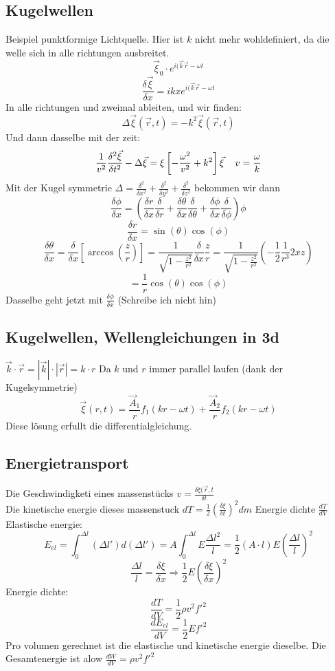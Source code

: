 \documentclass{article}
\newcommand{\mspc}{\hspace{0.4cm}}
\begin{document}
\subsection{Kugelwellen}
Beispiel punktformige Lichtquelle. Hier ist $k$ nicht mehr wohldefiniert, da die welle sich in alle richtungen ausbreitet.
\[\vec{\xi}_0\cdot e^{i(\vec{k}\vec{r}-\omega t}\]
\[\frac{\delta \vec{\xi}}{\delta x}=ikxe^{i(\vec{k}\vec{r}- \omega t}\]
In alle richtungen und zweimal ableiten, und wir finden:
\[\Delta\vec{\xi}(\vec{r},t)=-k^2\vec{\xi}(\vec{r},t)\]
Und dann dasselbe mit der zeit:
\[\frac{1}{v^2}\frac{\delta^2\vec{\xi}}{\delta t^2}-\Delta\vec{\xi}=\xi\left[-\frac{\omega^2}{v^2}+k^2\right]\vec{\xi}\mspc v=\frac{\omega}{k}\]
Mit der Kugel symmetrie $\Delta = \frac{\delta^2}{\delta x^2}+\frac{\delta^2}{\delta y^2}+\frac{\delta^2}{\delta z^2}$
bekommen wir dann 
\[\frac{\delta \phi}{\delta x}=\left(\frac{\delta r}{\delta x}\frac{\delta}{\delta r}+\frac{\delta \theta}{\delta x}\frac{\delta}{\delta \theta}+\frac{\delta \phi}{\delta x}\frac{\delta}{\delta \phi}\right)\phi\]
\[\frac{\delta r}{\delta x}=\sin(\theta)\cos(\phi)\]
\[\frac{\delta\theta}{\delta x}=\frac{\delta}{\delta x}\left[\arccos\left(\frac{z}{r}\right)\right]=\frac{1}{\sqrt{1-\frac{z^2}{r^2}}}\frac{\delta}{\delta x}\frac{z}{r}=\frac{1}{\sqrt{1-\frac{z^2}{r^2}}}\left(-\frac{1}{2}\frac{1}{r^3}2xz\right)\]
\[=\frac{1}{r}\cos(\theta)\cos(\phi)\]
Dasselbe geht jetzt mit $\frac{\delta \phi}{\delta x}$ (Schreibe ich nicht hin)
\subsection{Kugelwellen, Wellengleichungen in 3d}$\vec{k}\cdot\vec{r}= |\vec{k}|\cdot|\vec{r}|=k\cdot r$ Da $k$ und $r$ immer parallel laufen (dank der Kugelsymmetrie)
\[\vec{\xi}(r,t)=\frac{\vec{A}_1}{r}f_1(kr-\omega t)+\frac{\vec{A}_2}{r}f_2(kr-\omega t)\]
Diese lösung erfullt die differentialgleichung.
\subsection{Energietransport} Die Geschwindigketi eines massenstücks $v=\frac{\delta \xi(\vec{r},t}{\delta t}$\\
Die kinetische energie dieses massenstuck $dT=\frac{1}{2}\left(\frac{\delta \xi}{\delta t}\right)^2 dm$
Energie dichte $\frac{dT}{dV}$
\\
Elastische energie:
\[E_{el}=\int_0^{\Delta l}(\Delta l')d(\Delta l')=A\int_0^{\Delta l}E\frac{\Delta l^2}{l}=\frac{1}{2}(A\cdot l)E\left(\frac{\Delta l}{l}\right)^2\]
\[\frac{\Delta l}{l}=\frac{\delta \xi}{\delta x}\Rightarrow\frac{1}{2}E\left(\frac{\delta \xi}{\delta x}\right)^2\]
Energie dichte:
\[\frac{dT}{dV}=\frac{1}{2}\rho v^2 f'^2\]
\[\frac{dE_{el}}{dV}=\frac{1}{2}Ef'^2\]
Pro volumen gerechnet ist die elastische und kinetische energie dieselbe. Die Gesamtenergie ist alow $\frac{dW}{dV}=\rho v^2f'^2$\\
\end{document}
